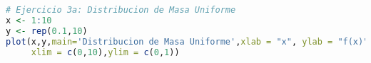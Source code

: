 \begin{lstlisting}[language=R]
# Ejercicio 3a: Distribucion de Masa Uniforme
x <- 1:10
y <- rep(0.1,10)
plot(x,y,main='Distribucion de Masa Uniforme',xlab = "x", ylab = "f(x)",
     xlim = c(0,10),ylim = c(0,1))
\end{lstlisting}

